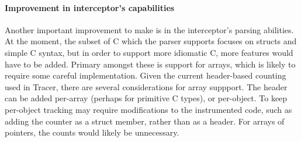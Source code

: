 \paragraph{Improvement in interceptor's capabilities}
Another important improvement to make is in the interceptor's parsing abilities. At the moment, the subset of C which the parser supports focuses on structs and simple C syntax, but in order to support more idiomatic C, more features would have to be added. Primary amongst these is support for arrays, which is likely to require some careful implementation. Given the current header-based counting used in Tracer, there are several considerations for array suppport. The header can be added per-array (perhaps for primitive C types), or per-object. To keep per-object tracking may require modifications to the instrumented code, such as adding the counter as a struct member, rather than as a header. For arrays of pointers, the counts would likely be unnecessary.
